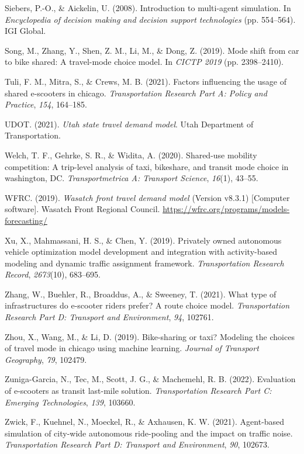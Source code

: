 \documentclass[fancy, masters]{byuthesis}
\newlength{\cslhangindent}
\newlength{\cslentryspacingunit} %
\newenvironment{CSLReferences}[2] %
 {%
  \setlength{\parindent}{0pt}
  \ifodd #1
  \let\oldpar\par
  \def\par{\hangindent=\cslhangindent\oldpar}
  \fi
  \setlength{\parskip}{#2\cslentryspacingunit}
 }%
 {}
\begin{document}
\begin{CSLReferences}{1}{0}
\leavevmode{}%
Siebers, P.-O., \& Aickelin, U. (2008). Introduction to multi-agent simulation. In \emph{Encyclopedia of decision making and decision support technologies} (pp. 554--564). IGI Global.

\leavevmode{}%
Song, M., Zhang, Y., Shen, Z. M., Li, M., \& Dong, Z. (2019). Mode shift from car to bike shared: A travel-mode choice model. In \emph{CICTP 2019} (pp. 2398--2410).

\leavevmode{}%
Tuli, F. M., Mitra, S., \& Crews, M. B. (2021). Factors influencing the usage of shared e-scooters in chicago. \emph{Transportation Research Part A: Policy and Practice}, \emph{154}, 164--185.

\leavevmode{}%
UDOT. (2021). \emph{Utah state travel demand model}. Utah Department of Transportation.

\leavevmode{}%
Welch, T. F., Gehrke, S. R., \& Widita, A. (2020). Shared-use mobility competition: A trip-level analysis of taxi, bikeshare, and transit mode choice in washington, DC. \emph{Transportmetrica A: Transport Science}, \emph{16}(1), 43--55.

\leavevmode{}%
WFRC. (2019). \emph{Wasatch front travel demand model} (Version v8.3.1) {[}Computer software{]}. Wasatch Front Regional Council. \url{https://wfrc.org/programs/models-forecasting/}

\leavevmode{}%
Xu, X., Mahmassani, H. S., \& Chen, Y. (2019). Privately owned autonomous vehicle optimization model development and integration with activity-based modeling and dynamic traffic assignment framework. \emph{Transportation Research Record}, \emph{2673}(10), 683--695.

\leavevmode{}%
Zhang, W., Buehler, R., Broaddus, A., \& Sweeney, T. (2021). What type of infrastructures do e-scooter riders prefer? A route choice model. \emph{Transportation Research Part D: Transport and Environment}, \emph{94}, 102761.

\leavevmode{}%
Zhou, X., Wang, M., \& Li, D. (2019). Bike-sharing or taxi? Modeling the choices of travel mode in chicago using machine learning. \emph{Journal of Transport Geography}, \emph{79}, 102479.

\leavevmode{}%
Zuniga-Garcia, N., Tec, M., Scott, J. G., \& Machemehl, R. B. (2022). Evaluation of e-scooters as transit last-mile solution. \emph{Transportation Research Part C: Emerging Technologies}, \emph{139}, 103660.

\leavevmode{}%
Zwick, F., Kuehnel, N., Moeckel, R., \& Axhausen, K. W. (2021). Agent-based simulation of city-wide autonomous ride-pooling and the impact on traffic noise. \emph{Transportation Research Part D: Transport and Environment}, \emph{90}, 102673.

\end{CSLReferences}

%
\end{document}
